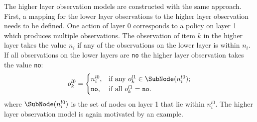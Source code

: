 The higher layer observation models are constructed with the same approach. First, a mapping for the lower layer observations to the higher layer observation needs to be defined. One action of layer 0 corresponds to a policy on layer 1 which produces multiple observations. The observation of item $k$ in the higher layer takes the value $n_i$ if any of the observations on the lower layer is within $n_i$. If all observations on the lower layers are \texttt{no} the higher layer observation takes the value \texttt{no}:
\begin{equation}
    o_k^{l0} = \begin{cases}
    n_i^{l0}, &\text{if any }o_k^{l1}\in \SubNode(n_i^{l0});\\
    \texttt{no}, &\text{if all }o_k^{l1}=\texttt{no}.
    \end{cases}
\end{equation}
where $\SubNode(n_i^{l0})$ is the set of nodes on layer 1 that lie within $n_i^{l0}$. The higher layer observation model is again motivated by an example.
